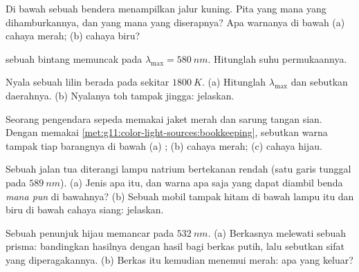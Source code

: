 \begin{exercise}[$\star$]\label{exo:g11:color-light-sources:4}
Di bawah  sebuah bendera menampilkan jalur kuning. Pita
yang mana yang dihamburkannya, dan yang mana yang diserapnya? Apa
warnanya di bawah (a) cahaya merah; (b) cahaya biru?
\end{exercise}

\begin{exercise}[$\star$]\label{exo:g11:color-light-sources:5}
 sebuah bintang memuncak pada
$\lambda_{\max} = \qty{580}{nm}$. Hitunglah suhu permukaannya.
\end{exercise}

\begin{exercise}[$\star\star$]\label{exo:g11:color-light-sources:6}
Nyala sebuah lilin berada pada sekitar $\qty{1800}{K}$. (a) Hitunglah
$\lambda_{\max}$ dan sebutkan daerahnya. (b) Nyalanya toh tampak
jingga: jelaskan.
\end{exercise}

\begin{exercise}[$\star\star$]\label{exo:g11:color-light-sources:7}
Seorang pengendara sepeda memakai jaket merah dan sarung tangan sian.
Dengan memakai \cref{met:g11:color-light-sources:bookkeeping},
sebutkan warna tampak tiap barangnya di bawah (a) ;
(b) cahaya merah; (c) cahaya hijau.
\end{exercise}

\begin{exercise}[$\star\star$]\label{exo:g11:color-light-sources:8}
Sebuah jalan tua diterangi lampu natrium bertekanan rendah (satu garis
tunggal pada $\qty{589}{nm}$). (a) Jenis  apa itu, dan warna
apa saja yang dapat diambil benda \emph{mana pun} di bawahnya? (b)
Sebuah mobil tampak hitam di bawah lampu itu dan biru di bawah cahaya
siang: jelaskan.
\end{exercise}

\begin{exercise}[$\star\star$]\label{exo:g11:color-light-sources:9}
Sebuah penunjuk  hijau memancar pada $\qty{532}{nm}$. (a) Berkasnya
melewati sebuah prisma: bandingkan hasilnya dengan hasil bagi berkas
putih, lalu sebutkan sifat yang diperagakannya. (b) Berkas itu kemudian
menemui  merah: apa yang keluar?
\end{exercise}

